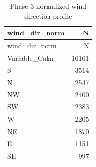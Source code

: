 \documentclass[
]{article}
\begin{document}
\begin{longtable}[]{@{}lr@{}}
\caption{Phase 3 normalized wind direction profile}\tabularnewline
\toprule\noalign{}
wind\_dir\_norm & N \\
\midrule\noalign{}
\endfirsthead
\toprule\noalign{}
wind\_dir\_norm & N \\
\midrule\noalign{}
\endhead
\bottomrule\noalign{}
\endlastfoot
Variable\_Calm & 16161 \\
S & 3514 \\
N & 2547 \\
NW & 2400 \\
SW & 2383 \\
W & 2205 \\
NE & 1870 \\
E & 1151 \\
SE & 997 \\
\end{longtable}
\end{document}
